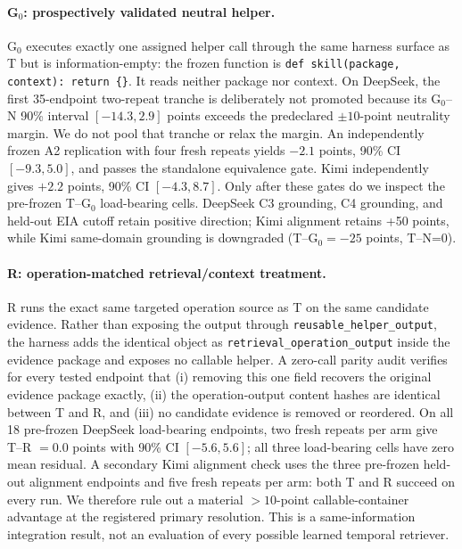 \paragraph{G$_0$: prospectively validated neutral helper.}
G$_0$ executes exactly one assigned helper call through the same harness surface as T but is information-empty: the frozen function is \texttt{def skill(package, context): return \{\}}. It reads neither package nor context. On DeepSeek, the first 35-endpoint two-repeat tranche is deliberately not promoted because its G$_0$--N 90\% interval $[-14.3,2.9]$ points exceeds the predeclared $\pm10$-point neutrality margin. We do not pool that tranche or relax the margin. An independently frozen A2 replication with four fresh repeats yields $-2.1$ points, 90\% CI $[-9.3,5.0]$, and passes the standalone equivalence gate. Kimi independently gives $+2.2$ points, 90\% CI $[-4.3,8.7]$. Only after these gates do we inspect the pre-frozen T--G$_0$ load-bearing cells. DeepSeek C3 grounding, C4 grounding, and held-out EIA cutoff retain positive direction; Kimi alignment retains +50 points, while Kimi same-domain grounding is downgraded (T--G$_0=-25$ points, T--N=0).

\paragraph{R: operation-matched retrieval/context treatment.}
R runs the exact same targeted operation source as T on the same candidate evidence. Rather than exposing the output through \texttt{reusable\_helper\_output}, the harness adds the identical object as \texttt{retrieval\_operation\_output} inside the evidence package and exposes no callable helper. A zero-call parity audit verifies for every tested endpoint that (i) removing this one field recovers the original evidence package exactly, (ii) the operation-output content hashes are identical between T and R, and (iii) no candidate evidence is removed or reordered. On all 18 pre-frozen DeepSeek load-bearing endpoints, two fresh repeats per arm give T--R $=0.0$ points with 90\% CI $[-5.6,5.6]$; all three load-bearing cells have zero mean residual. A secondary Kimi alignment check uses the three pre-frozen held-out alignment endpoints and five fresh repeats per arm: both T and R succeed on every run. We therefore rule out a material $>10$-point callable-container advantage at the registered primary resolution. This is a same-information integration result, not an evaluation of every possible learned temporal retriever.

